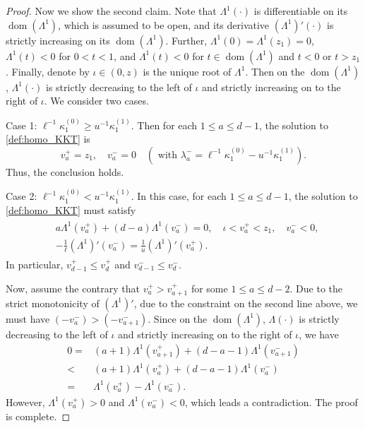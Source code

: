 \documentclass[aap,preprint]{imsart}
\theoremstyle{plain}
\theoremstyle{definition}
\begin{document}
\begin{appendix}
\begin{proof}
Now we show the second claim. Note that $\Lambda^1(\cdot)$ is differentiable on its $\operatorname{dom}(\Lambda^1)$, which is assumed to be open, and its derivative $(\Lambda^1)'(\cdot)$ is strictly increasing on its $\operatorname{dom}(\Lambda^1)$.  Further, $\Lambda^1(0) = \Lambda^1(z_1) = 0$, $\Lambda^{1}(t) < 0$ for $0 < t < 1$, and $\Lambda^1(t) < 0$ for $t \in \operatorname{dom}(\Lambda^1)$ and $t < 0$ or $t > z_1$. Finally, denote by  $\iota \in (0,z)$ is the unique root of $\Lambda^1$. Then on the $\operatorname{dom}(\Lambda^1)$, $\Lambda^1(\cdot)$ is strictly decreasing to the left of $\iota$ and strictly increasing on to the right of $\iota$.   We consider two cases.

Case 1: $\ell^{-1} \kappa_1^{(0)} \geq u^{-1} \kappa_1^{(1)}$. Then for each $1 \leq a \leq d-1$, the solution to \eqref{def:homo_KKT} is
$$
v_a^{+} = z_1,\quad v_a^{-} = 0 \quad (\text{ with }
\lambda_{a}^{-} = \ell^{-1} \kappa_1^{(0)} - u^{-1} \kappa_1^{(1)}
).
$$
Thus, the conclusion holds.

Case 2: $\ell^{-1} \kappa_1^{(0)} < u^{-1} \kappa_1^{(1)}$.  
In this case, for each $1 \leq a \leq d-1$, the solution to \eqref{def:homo_KKT} must satisfy
\begin{align*}
\begin{split}
       &a \Lambda^{1}(v_a^{+}) + (d-a) \Lambda^{1}(v_a^{-}) = 0,\quad \iota < v_a^{+} < z_{1}, \quad v_{a}^{-} < 0, \\
     & - \frac{1}{\ell} (\Lambda^1)'(v_a^{-}) = \frac{1}{u} (\Lambda^1)'(v_a^{+}).
\end{split}
\end{align*}
In particular, $v_{d-1}^{+} \leq v_{d}^{+}$ and 
$v_{d-1}^{-} \leq v_{d}^{-}$. 

Now, assume the contrary that
$v_a^{+} > v_{a+1}^{+}$ for some $1 \leq a \leq d-2$. Due 
to the strict monotonicity of $(\Lambda^1)'$, due to the constraint on the second line above, we must have $(-v_a^{-}) > (-v_{a+1}^{-})$. Since on the $\operatorname{dom}(\Lambda^1)$, $\Lambda(\cdot)$ is strictly decreasing to the left of $\iota$ and strictly increasing on to the right of $\iota$, we have
\begin{align*}
    0 = &(a+1) \Lambda^1(v_{a+1}^{+}) + (d-a-1)\Lambda^1(v_{a+1}^{-})\\
    < &   (a+1) \Lambda^1(v_{a}^{+}) + (d-a-1)\Lambda^1(v_{a}^{-}) \\
    = & \Lambda^1(v_{a}^{+}) - \Lambda^1(v_{a}^{-}).
\end{align*}
However,  $\Lambda^1(v_{a}^{+}) > 0$ and $\Lambda^1(v_{a}^{-}) < 0$, which leads a contradiction. The proof is complete.
\end{proof}



\end{appendix}
\end{document}
